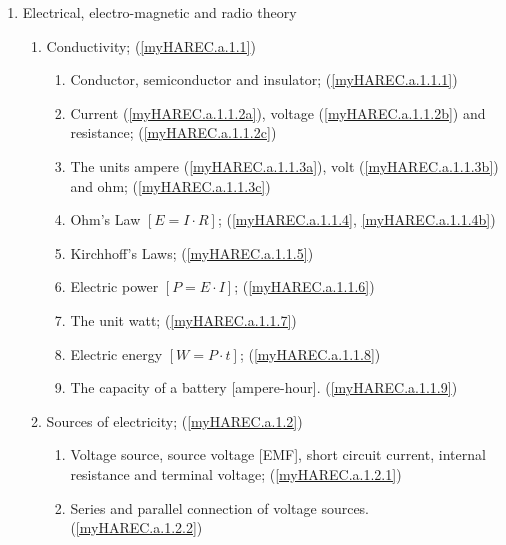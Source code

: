 \renewcommand{\theenumiv}{\arabic{enumiv}}
\renewcommand{\labelenumiv}{\theenumi.\theenumii.\theenumiii.\theenumiv}
\renewcommand{\p@enumiv}{\theenumi.\theenumii.\theenumiii.}
\makeatother

\begin{enumerate}
\item Electrical, electro-magnetic and radio theory
\begin{enumerate}

\item Conductivity; (\ref{myHAREC.a.1.1})\label{HAREC.a.1.1}
\begin{enumerate}
\item Conductor, semiconductor and insulator; (\ref{myHAREC.a.1.1.1})\label{HAREC.a.1.1.1}
\item Current (\ref{myHAREC.a.1.1.2a}), voltage (\ref{myHAREC.a.1.1.2b}) and resistance; (\ref{myHAREC.a.1.1.2c})\label{HAREC.a.1.1.2}
\item The units ampere (\ref{myHAREC.a.1.1.3a}), volt (\ref{myHAREC.a.1.1.3b}) and ohm; (\ref{myHAREC.a.1.1.3c})\label{HAREC.a.1.1.3}
\item Ohm's Law  \(\left[E = I \cdot R\right]\); (\ref{myHAREC.a.1.1.4}, \ref{myHAREC.a.1.1.4b})\label{HAREC.a.1.1.4}
\item Kirchhoff's Laws; (\ref{myHAREC.a.1.1.5})\label{HAREC.a.1.1.5}
\item Electric power \(\left[P = E \cdot I\right]\); (\ref{myHAREC.a.1.1.6})\label{HAREC.a.1.1.6}
\item The unit watt; (\ref{myHAREC.a.1.1.7})\label{HAREC.a.1.1.7}
\item Electric energy \(\left[W = P \cdot t\right]\); (\ref{myHAREC.a.1.1.8})\label{HAREC.a.1.1.8}
\item The capacity of a battery [ampere-hour]. (\ref{myHAREC.a.1.1.9})\label{HAREC.a.1.1.9}
\end{enumerate}

\item Sources of electricity; (\ref{myHAREC.a.1.2})\label{HAREC.a.1.2}
\begin{enumerate}
\item Voltage source, source voltage [EMF], short circuit current, inter­nal resistance and terminal voltage; (\ref{myHAREC.a.1.2.1})\label{HAREC.a.1.2.1}
\item Series and parallel connection of voltage sources. (\ref{myHAREC.a.1.2.2})\label{HAREC.a.1.2.2}
\end{enumerate}


\end{enumerate}
\end{enumerate}
